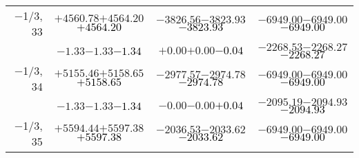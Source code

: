 \documentclass[compress]{beamer}
\begin{document}
\begin{frame}
{\begin{tabular}{r | c | c | c}
$-$1/3, 33 & $+4560.78$\hspace{0.1 cm}$+4564.20$\hspace{0.1 cm}\textcolor{black}{$+4564.20$} & $-3826.56$\hspace{0.1 cm}$-3823.93$\hspace{0.1 cm}\textcolor{black}{$-3823.93$} & $-6949.00$\hspace{0.1 cm}$-6949.00$\hspace{0.1 cm}\textcolor{black}{$-6949.00$} \\
           & $-1.33$\hspace{0.1 cm}$-1.33$\hspace{0.1 cm}\textcolor{black}{$-1.34$} & $+0.00$\hspace{0.1 cm}$+0.00$\hspace{0.1 cm}\textcolor{black}{$-0.04$} & $-2268.53$\hspace{0.1 cm}$-2268.27$\hspace{0.1 cm}\textcolor{black}{$-2268.27$} \\
$-$1/3, 34 & $+5155.46$\hspace{0.1 cm}$+5158.65$\hspace{0.1 cm}\textcolor{black}{$+5158.65$} & $-2977.57$\hspace{0.1 cm}$-2974.78$\hspace{0.1 cm}\textcolor{black}{$-2974.78$} & $-6949.00$\hspace{0.1 cm}$-6949.00$\hspace{0.1 cm}\textcolor{black}{$-6949.00$} \\
           & $-1.33$\hspace{0.1 cm}$-1.33$\hspace{0.1 cm}\textcolor{black}{$-1.34$} & $-0.00$\hspace{0.1 cm}$-0.00$\hspace{0.1 cm}\textcolor{black}{$+0.04$} & $-2095.19$\hspace{0.1 cm}$-2094.93$\hspace{0.1 cm}\textcolor{black}{$-2094.93$} \\
$-$1/3, 35 & $+5594.44$\hspace{0.1 cm}$+5597.38$\hspace{0.1 cm}\textcolor{black}{$+5597.38$} & $-2036.53$\hspace{0.1 cm}$-2033.62$\hspace{0.1 cm}\textcolor{black}{$-2033.62$} & $-6949.00$\hspace{0.1 cm}$-6949.00$\hspace{0.1 cm}\textcolor{black}{$-6949.00$} \\

\end{tabular}}
\end{frame}
\end{document}
